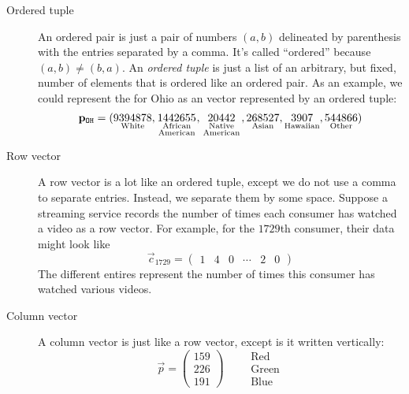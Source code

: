 \documentclass{ximera}
\begin{document}
\begin{concept}
\begin{description}
\item[Ordered tuple] An ordered pair is just a pair of numbers
  $(a,b)$ delineated by parenthesis with the entries separated by a
  comma. It's called ``ordered'' because $(a,b) \ne (b,a)$. An \textit{ordered
  tuple} is just a list of an arbitrary, but fixed, number of elements
  that is ordered like an ordered pair. As an example, we could
  represent the  for Ohio as an vector
  represented by an ordered tuple:
  \[
  \vec{p}_{\texttt{OH}} = (\underset{\text{White}}{9394878},\underset{\begin{smallmatrix}\text{\scriptsize African}\\ \text{\scriptsize American}\end{smallmatrix}}{1442655},\underset{\begin{smallmatrix}\text{\scriptsize Native}\\\text{\scriptsize American}\end{smallmatrix}}{20442},\underset{\text{Asian}}{268527},\underset{\text{Hawaiian}}{3907},\underset{\text{Other}}{544866})
  \]
\item[Row vector] A row vector is a lot like an ordered tuple, except
  we do not use a comma to separate entries. Instead, we separate them
  by some space.  Suppose a streaming service records the number of
  times each consumer has watched a video as a row vector. For
  example, for the $1729$th consumer, their data might look like
  \[
  \vec c_{1729} = \begin{pmatrix} 1 & 4 & 0 & \cdots & 2 & 0 \end{pmatrix}
  \]
  The different entires represent the number of times this consumer
  has watched various videos.
  \item[Column vector] A column vector is just like a row vector,
  except is it written vertically:
  \[
  \vec{p} = \begin{pmatrix}
    159\\  226 \\ 191\end{pmatrix}
    \qquad
    \begin{array}{l}
    \text{Red}\\
    \text{Green}\\
    \text{Blue}
    \end{array}
  \]

\end{description}
\end{concept}
\end{document}
